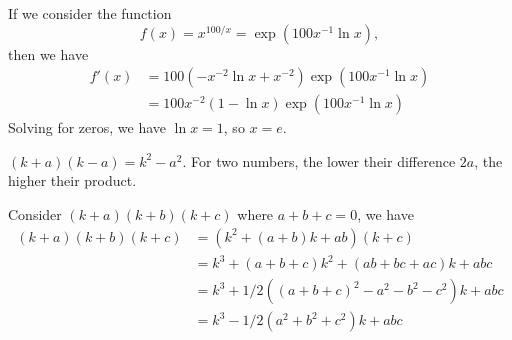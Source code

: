 \documentclass[12pt]{article}
\begin{document}
\begin{answer}
    If we consider the function
    \[
        f(x) = x^{100/x} = \exp(100x^{-1}\ln x),
    \]
    then we have
    \begin{align*}
        f'(x) &= 100(-x^{-2}\ln x + x^{-2})\exp(100x^{-1}\ln x)\\
                &= 100x^{-2}(1-\ln x)\exp(100x^{-1}\ln x)
    \end{align*}
    Solving for zeros, we have $\ln x = 1$, so $x = e$.

    $(k+a)(k-a) = k^{2} - a^{2}$. 
    For two numbers,
    the lower their difference $2a$, the higher their product.

    Consider $(k+a)(k+b)(k+c)$ where $a+b+c=0$,
    we have
    \begin{align*}
        (k+a)(k+b)(k+c) &= (k^{2} + (a+b)k + ab)(k + c)\\
                        &= k^{3} + (a+b+c)k^{2} + (ab + bc + ac)k + abc\\
                        &= k^{3} + 1/2((a+b+c)^{2} - a^{2} - b^{2} - c^{2})k + abc\\
                        &= k^{3} - 1/2(a^{2} + b^{2} + c^{2})k + abc
    \end{align*}

\end{answer}
\end{document}
